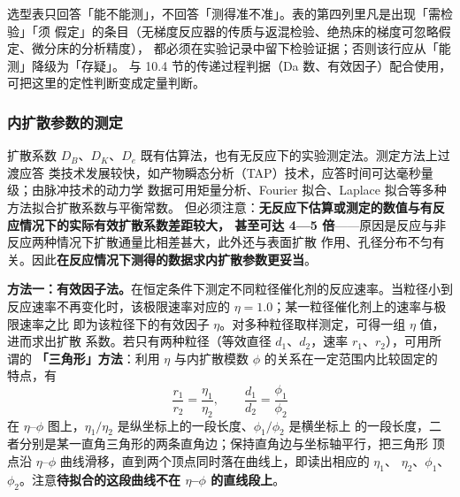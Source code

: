 \begin{crosscheck}
选型表只回答「能不能测」，不回答「测得准不准」。表的第四列里凡是出现「需检验」「须
假定」的条目（无梯度反应器的传质与返混检验、绝热床的梯度可忽略假定、微分床的分析精度），
都必须在实验记录中留下检验证据；否则该行应从「能测」降级为「存疑」。
与 10.4 节的传递过程判据（Da 数、有效因子）配合使用，可把这里的定性判断变成定量判断。
\end{crosscheck}

\subsubsection{内扩散参数的测定}

扩散系数 $D_B$、$D_K$、$D_e$ 既有估算法，也有无反应下的实验测定法。测定方法上过渡应答
类技术发展较快，如产物瞬态分析（TAP）技术，应答时间可达毫秒量级；由脉冲技术的动力学
数据可用矩量分析、Fourier 拟合、Laplace 拟合等多种方法拟合扩散系数与平衡常数。
但必须注意：\textbf{无反应下估算或测定的数值与有反应情况下的实际有效扩散系数差距较大，
甚至可达 4—5 倍}——原因是反应与非反应两种情况下扩散通量比相差甚大，此外还与表面扩散
作用、孔径分布不匀有关。因此\textbf{在反应情况下测得的数据求内扩散参数更妥当}。

\begin{principle}
\textbf{方法一：有效因子法。}在恒定条件下测定不同粒径催化剂的反应速率。当粒径小到
反应速率不再变化时，该极限速率对应的 $\eta=1.0$；某一粒径催化剂上的速率与极限速率之比
即为该粒径下的有效因子 $\eta$。对多种粒径取样测定，可得一组 $\eta$ 值，进而求出扩散
系数。若只有两种粒径（等效直径 $d_1$、$d_2$，速率 $r_1$、$r_2$），可用所谓的
\textbf{「三角形」方法}：利用 $\eta$ 与内扩散模数 $\phi$ 的关系在一定范围内比较固定的
特点，有
\begin{equation}
\frac{r_1}{r_2}=\frac{\eta_1}{\eta_2},\qquad
\frac{d_1}{d_2}=\frac{\phi_1}{\phi_2}
\label{eq:tri-method}
\end{equation}
在 $\eta$–$\phi$ 图上，$\eta_1/\eta_2$ 是纵坐标上的一段长度、$\phi_1/\phi_2$ 是横坐标上
的一段长度，二者分别是某一直角三角形的两条直角边；保持直角边与坐标轴平行，把三角形
顶点沿 $\eta$–$\phi$ 曲线滑移，直到两个顶点同时落在曲线上，即读出相应的 $\eta_1$、
$\eta_2$、$\phi_1$、$\phi_2$。注意\textbf{待拟合的这段曲线不在 $\eta$–$\phi$ 的直线段上}。
\end{principle}

